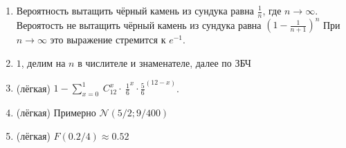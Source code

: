 \documentclass[a4paper,12pt]{article}
\def \cN{\mathcal{N}}
\begin{document}
\begin{enumerate}
\item
Вероятность вытащить чёрный камень из сундука равна $\frac{1}{n}$, где \newline $n\to\infty$. Вероятость не вытащить чёрный камень из сундука равна $(1-\frac{1}{n+1})^n$ При $n\to\infty$ это выражение стремится к $e^{-1}$.
\item $1$, делим на $n$ в числителе и знаменателе, далее по ЗБЧ


\item (лёгкая)
$1- \sum_{x=0}^1 \ {C^x_{12}}\cdot\ {\frac{1}{6}}^x\cdot{\frac{5}{6}}^{(12-x)}$.
\item (лёгкая)
Примерно $\cN(5/2;9/400)$
\item (лёгкая)
$F(0.2/4) \approx 0.52$
\end{enumerate}

\newpage
\end{document}
